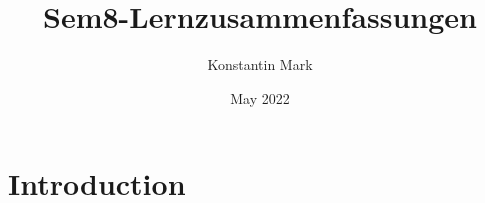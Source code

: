 \documentclass{article}
\title{Sem8-Lernzusammenfassungen}
\author{Konstantin Mark}
\date{May 2022}
\begin{document}
\maketitle

\section{Introduction}
\end{document}
